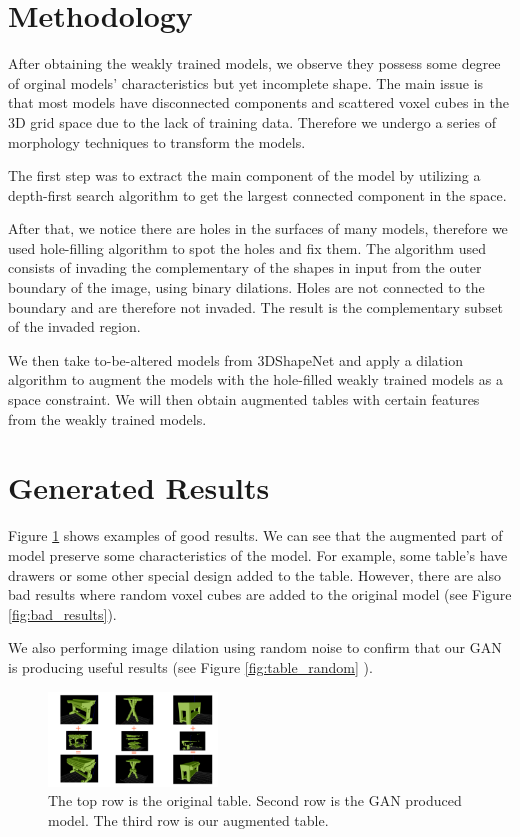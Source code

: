 \documentclass{sigchi}
\begin{document}
\section{Methodology}
After obtaining the weakly trained models, we observe they possess some degree of orginal models’ characteristics but yet incomplete shape. The main issue is that most models have disconnected components and scattered voxel cubes in the 3D grid space due to the lack of training data. Therefore we undergo a series of morphology techniques to transform the models.

The first step was to extract the main component of the model by utilizing a depth-first search algorithm to get the largest connected component in the space.

After that, we notice there are holes in the surfaces of many models, therefore we used hole-filling algorithm to spot the holes and fix them. The algorithm used consists of invading the complementary of the shapes in input from the outer boundary of the image, using binary dilations. Holes are not connected to the boundary and are therefore not invaded. The result is the complementary subset of the invaded region.

We then take to-be-altered models from 3DShapeNet and apply a dilation algorithm to augment the models with the hole-filled weakly trained models as a space constraint. We will then obtain augmented tables with certain features from the weakly trained models.


\section{Generated Results}

Figure \ref{fig:table_results} shows examples of good results. We can see that the augmented part of model preserve some characteristics of the model. For example, some table’s have drawers or some other special design added to the table. However, there are also bad results where random voxel cubes are added to the original model (see Figure \ref{fig:bad_results}). 

We also performing image dilation using random noise to confirm that our GAN  is producing useful results (see Figure \ref{fig:table_random} ).

\begin{figure}
\includegraphics[width=0.4\textwidth]{figs/table_results.png}
\centering
\caption{The top row is the original table. Second row is the GAN produced model. The third row is our augmented table.}
\label{fig:table_results}
\end{figure}
\end{document}
